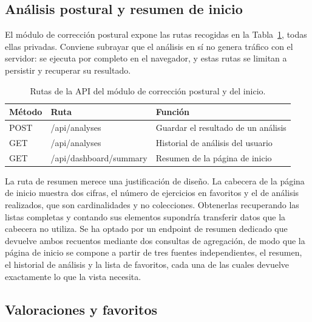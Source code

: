 \documentclass[12pt,a4paper,twoside,openright]{book}
\begin{document}
    \subsection{Análisis postural y resumen de inicio}
    \label{sec:api-analisis}

    El módulo de corrección postural expone las rutas recogidas en la
    Tabla~\ref{tab:api-analisis}, todas ellas privadas. Conviene subrayar que el
    análisis en sí no genera tráfico con el servidor: se ejecuta por completo en
    el navegador, y estas rutas se limitan a persistir y recuperar su resultado.

    \begin{table}[htbp]
        \centering
        \begin{tabular}{lll}
            \toprule
            \textbf{Método} & \textbf{Ruta} & \textbf{Función} \\
            \midrule
            POST & /api/analyses          & Guardar el resultado de un análisis \\
            GET  & /api/analyses          & Historial de análisis del usuario \\
            GET  & /api/dashboard/summary & Resumen de la página de inicio \\
            \bottomrule
        \end{tabular}
        \caption{Rutas de la API del módulo de corrección postural y del inicio.}
        \label{tab:api-analisis}
    \end{table}

    La ruta de resumen merece una justificación de diseño. La cabecera de la
    página de inicio muestra dos cifras, el número de ejercicios en favoritos y
    el de análisis realizados, que son cardinalidades y no colecciones.
    Obtenerlas recuperando las listas completas y contando sus elementos
    supondría transferir datos que la cabecera no utiliza. Se ha optado por un
    endpoint de resumen dedicado que devuelve ambos recuentos mediante dos
    consultas de agregación, de modo que la página de inicio se compone a partir
    de tres fuentes independientes, el resumen, el historial de análisis y la
    lista de favoritos, cada una de las cuales devuelve exactamente lo que la
    vista necesita.

    \subsection{Valoraciones y favoritos}
    \label{sec:api-social}
\end{document}
